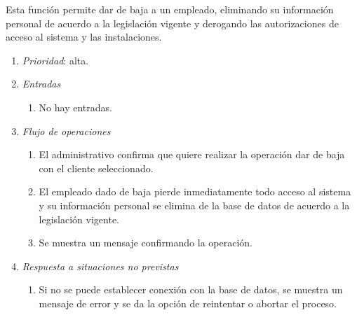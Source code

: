 

	Esta función permite dar de baja a un empleado, eliminando su información personal de acuerdo a la legislación vigente y derogando las autorizaciones de acceso al sistema y las instalaciones.
	
	\begin{enumerate}
		\item \textit{Prioridad}: alta.
		\item \textit{Entradas}
		\begin{enumerate}
			\item No hay entradas.
		\end{enumerate}
		\item \textit{Flujo de operaciones}
		\begin{enumerate}
			\item El administrativo confirma que quiere realizar la operación dar de baja con el cliente seleccionado.
			\item El empleado dado de baja pierde inmediatamente todo acceso al sistema y su información personal se elimina de la base de datos de acuerdo a la legislación vigente.
			\item Se muestra un mensaje confirmando la operación.
		\end{enumerate}
		\item \textit{Respuesta a situaciones no previstas}
		\begin{enumerate}
			\item Si no se puede establecer conexión con la base de datos, se muestra un mensaje de error y se da la opción de reintentar o abortar el proceso.
		\end{enumerate}
	\end{enumerate}